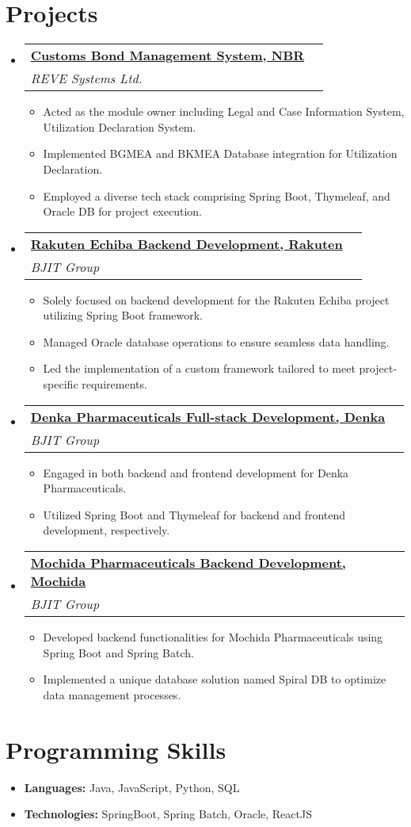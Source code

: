 \documentclass[a4paper,11pt]{article}
\makeatletter
\newcommand{\resumeItem}[1]{\item[$\bullet$] \small{#1 \vspace{-2pt}}}
\newcommand{\resumeSubHeadingListStart}{\begin{itemize}[leftmargin=0pt, label={}]}
\newcommand{\resumeSubHeadingListEnd}{\end{itemize}}
\newcommand{\resumeItemListStart}{\begin{itemize}}
\newcommand{\resumeItemListEnd}{\end{itemize}\vspace{-5pt}}
\newcommand{\resumeSubheading}[5]{
    \vspace{-1pt}\item
    \begin{tabular*}{1\textwidth}{l@{\extracolsep{\fill}}r}
    \textbf{\href{#4}{#1}} & #2 \\
    \textit{\small#3} & \textit{\small #5} \\
    \end{tabular*}\vspace{-5pt}
}
\makeatother
\begin{document}


    \section{Projects}
    \resumeSubHeadingListStart
    \resumeSubheading
    {Customs Bond Management System, NBR}{}
    {REVE Systems Ltd.}{https://cusbond.gov.bd/}{}
    \resumeItemListStart
    \resumeItem{Acted as the module owner including Legal and Case Information System, Utilization Declaration System.}
    \resumeItem{Implemented BGMEA and BKMEA Database integration for Utilization Declaration.}
    \resumeItem{Employed a diverse tech stack comprising Spring Boot, Thymeleaf, and Oracle DB for project execution.}
    \resumeItemListEnd
    \resumeSubheading
    {Rakuten Echiba Backend Development, Rakuten}{}
    {BJIT Group}{https://www.rakuten.co.jp/}{}
    \resumeItemListStart
    \resumeItem{Solely focused on backend development for the Rakuten Echiba project utilizing Spring Boot framework.}
    \resumeItem{Managed Oracle database operations to ensure seamless data handling.}
    \resumeItem{Led the implementation of a custom framework tailored to meet project-specific requirements.}
    \resumeItemListEnd
    \resumeSubheading
    {Denka Pharmaceuticals Full-stack Development, Denka}{}
    {BJIT Group}{https://www.denka.co.jp/eng/}{}
    \resumeItemListStart
    \resumeItem{Engaged in both backend and frontend development for Denka Pharmaceuticals.}
    \resumeItem{Utilized Spring Boot and Thymeleaf for backend and frontend development, respectively.}
    \resumeItemListEnd
    \resumeSubheading
    {Mochida Pharmaceuticals Backend Development, Mochida}{}
    {BJIT Group}{https://www.mochida.co.jp/english/}{}
    \resumeItemListStart
    \resumeItem{Developed backend functionalities for Mochida Pharmaceuticals using Spring Boot and Spring Batch.}
    \resumeItem{Implemented a unique database solution named Spiral DB to optimize data management processes.}
    \resumeItemListEnd
    \resumeSubHeadingListEnd



    \section{Programming Skills}
    \resumeSubHeadingListStart
    \item{
        \textbf{Languages:} Java, JavaScript, Python, SQL
    }
    \item{
        \textbf{Technologies:} SpringBoot, Spring Batch, Oracle, ReactJS
    }
    \resumeSubHeadingListEnd
\end{document}
